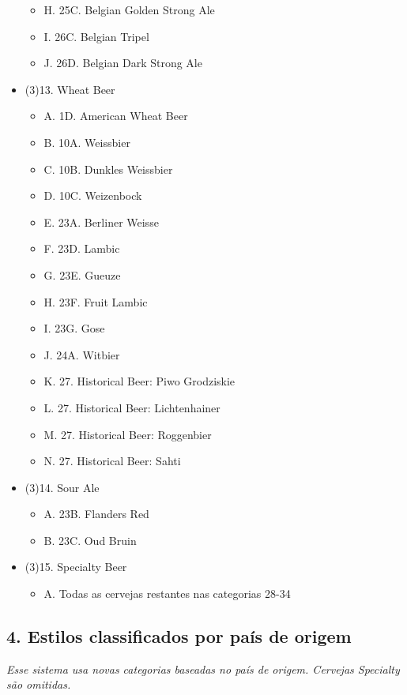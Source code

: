 \begin{multicols*}{2}
\begin{itemize}[noitemsep]
\begin{itemize}
  \item[] H. 25C. Belgian Golden Strong Ale
  \item[] I. 26C. Belgian Tripel
  \item[] J. 26D. Belgian Dark Strong Ale
\end{itemize}
\item[] (3)13. Wheat Beer
\begin{itemize}
  \item[] A. 1D. American Wheat Beer
  \item[] B. 10A. Weissbier
  \item[] C. 10B. Dunkles Weissbier
  \item[] D. 10C. Weizenbock
  \item[] E. 23A. Berliner Weisse
  \item[] F. 23D. Lambic
  \item[] G. 23E. Gueuze
  \item[] H. 23F. Fruit Lambic
  \item[] I. 23G. Gose
  \item[] J. 24A. Witbier
  \item[] K. 27. Historical Beer: Piwo Grodziskie
  \item[] L. 27. Historical Beer: Lichtenhainer
  \item[] M. 27. Historical Beer: Roggenbier
  \item[] N. 27. Historical Beer: Sahti
\end{itemize}
\item[] (3)14. Sour Ale
\begin{itemize}
  \item[] A. 23B. Flanders Red
  \item[] B. 23C. Oud Bruin
\end{itemize}
\item[] (3)15. Specialty Beer
\begin{itemize}
  \item[] A. Todas as cervejas restantes nas categorias 28-34
\end{itemize}
\end{itemize}

\subsection*{4. Estilos classificados por país de origem}

\textit{Esse sistema usa novas categorias baseadas no país de origem. Cervejas Specialty são omitidas.}


\end{multicols*}
